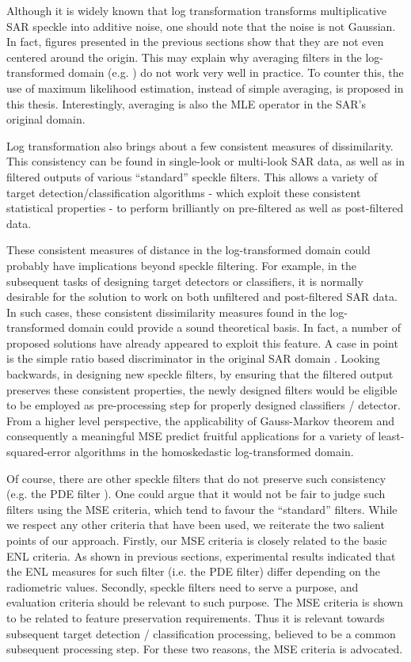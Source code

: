 Although it is widely known that log transformation transforms multiplicative SAR speckle into additive noise, 
	one should note that the noise is not Gaussian. In fact, figures presented in the previous sections show that 
	they are not even centered around the origin. 
This may explain why averaging filters in the log-transformed domain (e.g. \cite{Arsenault_JOptSocAm_1976}) do not 
	work very well in practice.
To counter this, the use of maximum likelihood estimation, instead of simple averaging, 
	is proposed in this thesis. %
        Interestingly, averaging is also the MLE operator in the SAR's original domain.

Log transformation also brings about a few consistent measures of dissimilarity.
	This consistency can be found in single-look or multi-look SAR data, 
	as well as in filtered outputs of various ``standard'' speckle filters.
This allows a variety of target detection/classification algorithms
  - which exploit these consistent statistical properties -
  to perform brilliantly on pre-filtered as well as post-filtered data.
        
These consistent measures of distance in the log-transformed domain could probably have implications beyond speckle filtering.
For example, in the subsequent tasks of designing target detectors or classifiers,
  it is normally desirable for the solution to work on both unfiltered and post-filtered SAR data.
In such cases, these consistent dissimilarity measures found in the log-transformed domain could provide a sound theoretical
	basis. In fact, a number of proposed solutions have already appeared to exploit this feature. 
A case in point is the simple ratio based discriminator in the original SAR domain \cite{Rignot_1993_TGRS_896}.
Looking backwards, in designing new speckle filters,
  by ensuring that the filtered output preserves these consistent properties,
	the newly designed filters would be eligible to be employed as pre-processing step for properly designed classifiers / detector.
From a higher level perspective, the applicability of Gauss-Markov theorem and consequently a meaningful MSE 
  predict fruitful applications for a variety of least-squared-error algorithms in the homoskedastic log-transformed domain.
        
Of course, there are other speckle filters that do not preserve such consistency 
	(e.g. the PDE filter \cite{You_TIP_2000}). One could argue that it would not be fair to judge such filters 
	using the MSE criteria, which tend to favour the ``standard'' filters.
While we respect any other criteria that have been used, we reiterate the two salient points of our approach. 
Firstly, our MSE criteria is closely related to the basic ENL criteria.
As shown in previous sections, experimental results indicated that
  the ENL measures for such filter (i.e. the PDE filter) differ depending  on the radiometric values. 
Secondly, speckle filters need to serve a purpose, and evaluation criteria should be relevant to such purpose.
The MSE criteria is shown to be related to feature preservation requirements.
Thus it is relevant towards subsequent target detection / classification processing, 
	believed to be a common subsequent processing step. 
For these two reasons, the MSE criteria is advocated.

